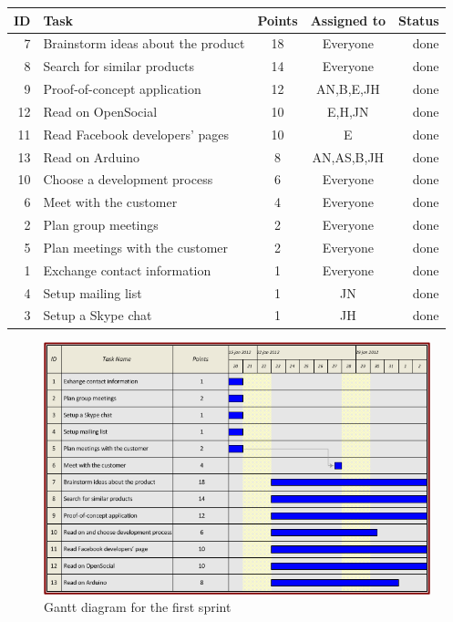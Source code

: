 \begin{table}[ht!]
\begin{tabular}{ | r | l | c | c | r | }

\hline
\textbf{ID} & \textbf{Task} & \textbf{Points} & \textbf{Assigned to} & \textbf{Status} \\
\hline

 7 & Brainstorm ideas about the product		& 18 & Everyone		& done \\
\hline
 8 & Search for similar products			& 14 & Everyone		& done \\
\hline
 9 & Proof-of-concept application			& 12 & AN,B,E,JH	& done \\
\hline
12 & Read on OpenSocial						& 10 & E,H,JN		& done \\
\hline
11 & Read Facebook developers' pages		& 10  & E			& done\\
\hline
13 & Read on Arduino						& 8  & AN,AS,B,JH	& done \\
\hline
10 & Choose a development process			& 6  & Everyone		& done \\
\hline
 6 & Meet with the customer					& 4  & Everyone		& done \\
\hline
 2 & Plan group meetings					& 2  & Everyone		& done \\
\hline
 5 & Plan meetings with the customer		& 2  & Everyone		& done \\
\hline
 1 & Exchange contact information			& 1  & Everyone		& done \\
\hline
 4 & Setup mailing list						& 1  & JN			& done \\
\hline
 3 & Setup a Skype chat						& 1  & JH			& done \\
\hline

\end{tabular}
\end{table}

\newpage

\begin{figure}[h!]
\centering \includegraphics[scale=0.8]{img/sprints-gantt1.png}
\caption{Gantt diagram for the first sprint}
\label{fig:sprints-gantt1}
\end{figure}

